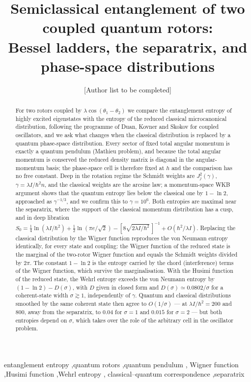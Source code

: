 \documentclass[preprint,12pt]{elsarticle}
\begin{document}
\begin{frontmatter}

\title{Semiclassical entanglement of two coupled quantum rotors:\\
Bessel ladders, the separatrix, and phase-space distributions}

\author[a]{[Author list to be completed]}
\address[a]{[Affiliation]}

\begin{abstract}
For two rotors coupled by $\lambda\cos(\theta_{1}-\theta_{2})$ we compare the
entanglement entropy of highly excited eigenstates with the entropy of the
reduced classical microcanonical distribution, following the programme of
Duan, Kovner and Skokov for coupled oscillators, and we ask what changes when
the classical distribution is replaced by a quantum phase-space distribution.
Every sector of fixed total angular momentum is exactly a quantum pendulum
(Mathieu problem), and because the total angular momentum is conserved the
reduced density matrix is diagonal in the angular-momentum basis; the
phase-space cell is therefore fixed at $h$ and the comparison has no free
constant. Deep in the rotation regime the Schmidt weights are $J_{j}^{2}(\gamma)$,
$\gamma=\lambda I/\hbar^{2}n$, and the classical weights are the arcsine law; a
momentum-space WKB argument shows that the quantum entropy lies below the
classical one by $1-\ln2$, approached as $\gamma^{-1/3}$, and we confirm this to
$\gamma=10^{6}$. Both entropies are maximal near the separatrix, where the
support of the classical momentum distribution has a cusp, and in deep
libration $S_{0}=\tfrac14\ln(\lambda I/\hbar^{2})+\tfrac12\ln(\pi e/\sqrt2)
-[8\sqrt{2\lambda I/\hbar^{2}}\,]^{-1}+O(\hbar^{2}/\lambda I)$. Replacing the
classical distribution by the Wigner function reproduces the von Neumann
entropy identically, for every state and coupling: the Wigner function of the
reduced state is the marginal of the two-rotor Wigner function and equals the
Schmidt weights divided by $2\pi$. The constant $1-\ln2$ is the entropy carried
by the chord (interference) terms of the Wigner function, which survive the
marginalisation. With the Husimi function of the reduced state, the Wehrl
entropy exceeds the von Neumann entropy by $(1-\ln2)-D(\sigma)$, with $D$ given
in closed form and $D(\sigma)\simeq0.0802/\sigma$ for a coherent-state width
$\sigma\gtrsim1$, independently of $\gamma$. Quantum and classical
distributions smoothed by the same coherent state then agree to $O(1/\sigma)$ ---
at $\lambda I/\hbar^{2}=200$ and $800$, away from the separatrix, to $0.04$ for
$\sigma=1$ and $0.015$ for $\sigma=2$ --- but both entropies depend on
$\sigma$, which takes over the role of the arbitrary cell in the oscillator
problem.
\end{abstract}

\begin{keyword}
entanglement entropy \sep quantum rotors \sep quantum pendulum \sep
Wigner function \sep Husimi function \sep Wehrl entropy \sep
classical--quantum correspondence \sep separatrix
\end{keyword}

\end{frontmatter}
\end{document}
